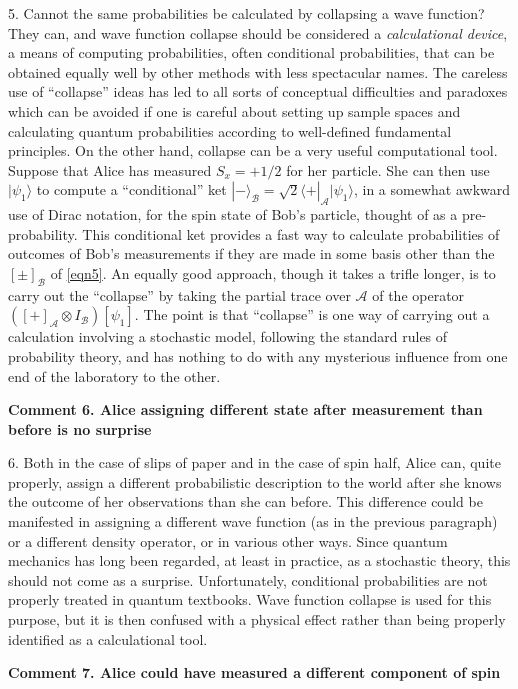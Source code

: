 \documentclass[12pt]{article} %
\def\outl#1{\par{\medskip\noindent\hspace*{.5cm}\bf
      \mathversion{bold}#1\mathversion{normal}\smallskip} }
\def\np{} \def\xa{} \def\xb{} \def\xn{} \def\xp{}
\def\outl#1{} \def\np{} \def\xa{} \def\xb{} \def\xn{} \def\xp{}
\def\outl#1{\par{\medskip\noindent\hspace*{.5cm}\bf
      \mathversion{bold}#1\mathversion{normal}\smallskip} }
\def\np{\newpage }\def\xn{\nopagebreak }\def\xp{\pagebreak }
\newcommand{\bra}[1]{\lgl#1|}
\newcommand{\ket}[1]{|#1\rgl }
\newcommand{\lgl}{\langle }
\newcommand{\ot}{\otimes }
\newcommand{\rgl}{\rangle }
\newcommand{\st}{\sqrt{2}}
\newcommand{\AM}{{\mathcal A}}
\newcommand{\BM}{{\mathcal B}}
\begin{document}
5. Cannot the same probabilities be calculated by collapsing a wave function?
They can, and wave function collapse should be considered a
\emph{calculational device}, a means of computing probabilities, often
conditional probabilities, that can be obtained equally well by other methods
with less spectacular names.  The careless use of ``collapse'' ideas has led
to all sorts of conceptual difficulties and paradoxes which can be avoided if
one is careful about setting up sample spaces and calculating quantum
probabilities according to well-defined fundamental principles.  On the other
hand, collapse can be a very useful computational tool.  Suppose that Alice
has measured $S_x=+1/2$ for her particle.  She can then use $\ket{\psi_1}$ to
compute a ``conditional'' ket $\ket{-}_\BM =\st\bra{+}_\AM\ket{\psi_1}$, in a
somewhat awkward use of Dirac notation, for the spin state of Bob's particle,
thought of as a pre-probability.  This conditional ket provides a fast way to
calculate probabilities of outcomes of Bob's measurements if they are made in
some basis other than the $[\pm]_\BM$ of \eqref{eqn5}.  An equally good
approach, though it takes a trifle longer, is to carry out the ``collapse'' by
taking the partial trace over $\AM$ of the operator $([+]_\AM \ot I_\BM)
[\psi_1]$. The point is that ``collapse'' is one way of carrying out a
calculation involving a stochastic model, following the standard rules of
probability theory, and has nothing to do with any mysterious influence from
one end of the laboratory to the other.

\xb 
\outl{Comment 6. Alice assigning different state after measurement than
  before is no surprise} 
\xa
 


6. Both in the case of slips of paper and in the case of spin half, Alice can,
quite properly, assign a different probabilistic description to the world
after she knows the outcome of her observations than she can before.  This
difference could be manifested in assigning a different wave function (as in
the previous paragraph) or a different density operator, or in various other
ways.  Since quantum mechanics has long been regarded, at least in practice,
as a stochastic theory, this should not come as a surprise.  Unfortunately,
conditional probabilities are not properly treated in quantum textbooks.  Wave
function collapse is used for this purpose, but it is then confused with a
physical effect rather than being properly identified as a calculational tool.

\xb 
\outl{Comment 7. Alice could have measured a different component of spin}
\xa
\end{document}
